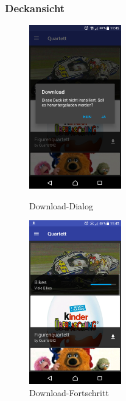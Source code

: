 \documentclass{scrartcl}
\begin{document}
\subsubsection{Deckansicht}
\begin{figure}[!ht]
  \centering
  \begin{minipage}{0.45\textwidth}
    \centering
    \includegraphics[width=4cm]{img/gallery_dialog.png}
    \caption{Download-Dialog}
  \end{minipage}
  \hfill
  \begin{minipage}{0.45\textwidth}
    \centering
    \includegraphics[width=4cm]{img/gallery_download.png}
    \caption{Download-Fortschritt}
  \end{minipage}
\end{figure}
\end{document}
